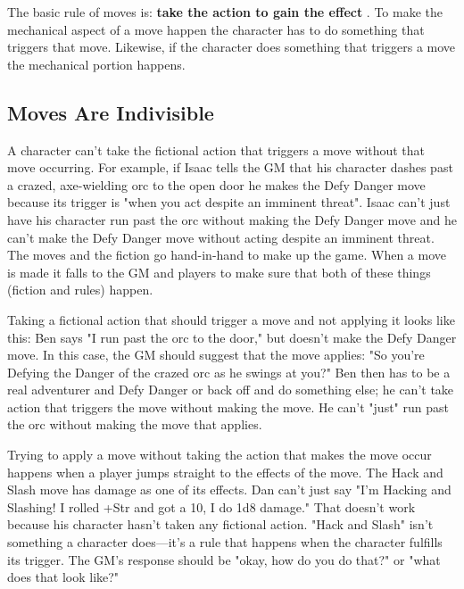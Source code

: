        

The basic rule of moves is: {\bf take the action to gain the effect} . To make the mechanical aspect of a move happen the character has to do something that triggers that move. Likewise, if the character does something that triggers a move the mechanical portion happens.

       
\subsection{Moves Are Indivisible}    
       

A character can't take the fictional action that triggers a move without that move occurring. For example, if Isaac tells the GM that his character dashes past a crazed, axe-wielding orc to the open door he makes the Defy Danger move because its trigger is "when you act despite an imminent threat". Isaac can't just have his character run past the orc without making the Defy Danger move and he can't make the Defy Danger move without acting despite an imminent threat. The moves and the fiction go hand-in-hand to make up the game. When a move is made it falls to the GM and players to make sure that both of these things (fiction and rules) happen.

       

Taking a fictional action that should trigger a move and not applying it looks like this: Ben says "I run past the orc to the door," but doesn't make the Defy Danger move. In this case, the GM should suggest that the move applies: "So you're Defying the Danger of the crazed orc as he swings at you?" Ben then has to be a real adventurer and Defy Danger or back off and do something else; he can't take action that triggers the move without making the move. He can't "just" run past the orc without making the move that applies.

       

Trying to apply a move without taking the action that makes the move occur happens when a player jumps straight to the effects of the move. The Hack and Slash move has damage as one of its effects. Dan can't just say "I'm Hacking and Slashing! I rolled +Str and got a 10, I do 1d8 damage." That doesn't work because his character hasn't taken any fictional action. "Hack and Slash" isn't something a character does—it's a rule that happens when the character fulfills its trigger. The GM's response should be "okay, how do you do that?" or "what does that look like?"

